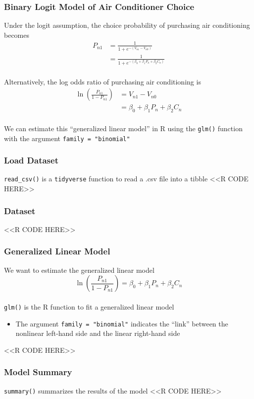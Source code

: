 \documentclass{beamer}
\begin{document}
\begin{frame}\frametitle{Binary Logit Model of Air Conditioner Choice}
    Under the logit assumption, the choice probability of purchasing air conditioning becomes
    \begin{align*}
        P_{n1} & = \frac{1}{1 + e^{-(V_{n1} - V_{n0})}} \\
        & = \frac{1}{1 + e^{-(\beta_0 + \beta_1 P_n + \beta_2 C_n)}}
    \end{align*} \\
    \vspace{2ex}
    Alternatively, the log odds ratio of purchasing air conditioning is
    \begin{align*}
        \ln \left( \frac{P_{n1}}{1 - P_{n1}} \right) & = V_{n1} - V_{n0} \\
        & = \beta_0 + \beta_1 P_n + \beta_2 C_n
    \end{align*} \\
    \vspace{2ex}
    We can estimate this ``generalized linear model'' in R using the \texttt{glm()} function with the argument \texttt{family = "binomial"}
\end{frame}

\begin{frame}[fragile]\frametitle{Load Dataset}
    \texttt{read\_csv()} is a \texttt{tidyverse} function to read a .csv file into a tibble
    <<R CODE HERE>>
\end{frame}

\begin{frame}[fragile]\frametitle{Dataset}
    <<R CODE HERE>>
\end{frame}

\begin{frame}[fragile]\frametitle{Generalized Linear Model}
    We want to estimate the generalized linear model
    $$\ln \left( \frac{P_{n1}}{1 - P_{n1}} \right) = \beta_0 + \beta_1 P_n + \beta_2 C_n$$ \\
    \vspace{3ex}
    \texttt{glm()} is the R function to fit a generalized linear model
    \begin{itemize}
        \item The argument \texttt{family = "binomial"} indicates the ``link'' between the nonlinear left-hand side and the linear right-hand side
    \end{itemize}
    <<R CODE HERE>>
\end{frame}

\begin{frame}[fragile]\frametitle{Model Summary}
    \texttt{summary()} summarizes the results of the model
    \vspace{1ex}
    <<R CODE HERE>>
\end{frame}
\end{document}
